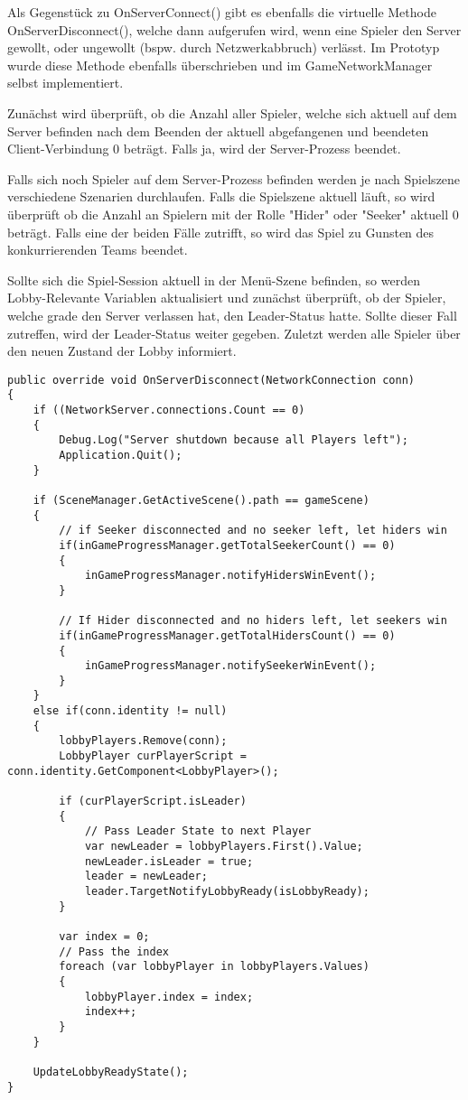 Als Gegenstück zu OnServerConnect() gibt es ebenfalls die virtuelle Methode OnServerDisconnect(), welche dann aufgerufen wird, wenn eine Spieler den Server gewollt, oder ungewollt (bspw. durch Netzwerkabbruch) verlässt. Im Prototyp wurde diese Methode ebenfalls überschrieben und im GameNetworkManager selbst implementiert. 

Zunächst wird überprüft, ob die Anzahl aller Spieler, welche sich aktuell auf dem Server befinden nach dem Beenden der aktuell abgefangenen und beendeten Client-Verbindung 0 beträgt. Falls ja, wird der Server-Prozess beendet. 

Falls sich noch Spieler auf dem Server-Prozess befinden werden je nach Spielszene verschiedene Szenarien durchlaufen. Falls die Spielszene aktuell läuft, so wird überprüft ob die Anzahl an Spielern mit der Rolle "Hider" oder "Seeker" aktuell 0 beträgt. Falls eine der beiden Fälle zutrifft, so wird das Spiel zu Gunsten des konkurrierenden Teams beendet.

Sollte sich die Spiel-Session aktuell in der Menü-Szene befinden, so werden Lobby-Relevante Variablen aktualisiert und zunächst überprüft, ob der Spieler, welche grade den Server verlassen hat, den Leader-Status hatte. Sollte dieser Fall zutreffen, wird der Leader-Status weiter gegeben. Zuletzt werden alle Spieler über den neuen Zustand der Lobby informiert.

\begin{lstlisting}[caption= GameNetworkManager.cs OnServerDisconnect()]
public override void OnServerDisconnect(NetworkConnection conn)
{
	if ((NetworkServer.connections.Count == 0)
	{
		Debug.Log("Server shutdown because all Players left");
		Application.Quit();
	}

	if (SceneManager.GetActiveScene().path == gameScene)
	{
		// if Seeker disconnected and no seeker left, let hiders win
		if(inGameProgressManager.getTotalSeekerCount() == 0)
		{
			inGameProgressManager.notifyHidersWinEvent();
		}
		
		// If Hider disconnected and no hiders left, let seekers win
		if(inGameProgressManager.getTotalHidersCount() == 0)
		{
			inGameProgressManager.notifySeekerWinEvent();
		}
	}
	else if(conn.identity != null)
	{
		lobbyPlayers.Remove(conn);
		LobbyPlayer curPlayerScript = conn.identity.GetComponent<LobbyPlayer>();
			
		if (curPlayerScript.isLeader)
		{
			// Pass Leader State to next Player
			var newLeader = lobbyPlayers.First().Value;
			newLeader.isLeader = true;
			leader = newLeader;
			leader.TargetNotifyLobbyReady(isLobbyReady);
		}
			
		var index = 0;
		// Pass the index
		foreach (var lobbyPlayer in lobbyPlayers.Values)
		{
			lobbyPlayer.index = index;
			index++;
		}
	}
		
	UpdateLobbyReadyState();
}
\end{lstlisting}

